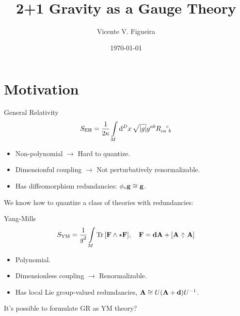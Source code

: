\documentclass{beamer}
\title{2+1 Gravity as a Gauge Theory}
\author{Vicente V. Figueira}
\institute{II Agorá Meeting --- IFUSP}
\date{\today}
\newcommand{\wedgecomma}{\stackon[1pt]{,}{\smash{\scriptsize$\wedge$}}}
\newcommand{\wedgecomm}[2]{\qty[ #1\ \wedgecomma\ #2 ]}
\begin{document}
\nocite{*}

\begin{frame}
    \vspace{2cm}
    \titlepage%
\end{frame}


\section{Motivation}
\begin{frame}{General Relativity}
    $$S_{\textnormal{EH}}=\frac{1}{2\kappa}\int\limits_M\dd[D]{x}\sqrt{\abs {g}}g^{ab}\tensor{R}{_c_a^c_b}$$\pause
    \begin{itemize}
        \item Non-polynomial $\rightarrow$ Hard to quantize.\pause
        \item Dimensionful coupling $\rightarrow$ Not perturbatively renormalizable.\pause
        \item Has diffeomorphism redundancies: $\phi_\ast\vb g\cong \vb g $.\pause
    \end{itemize}
    
    \vspace{2cm}

    We know how to quantize a class of theories with redundancies:
\end{frame}

\begin{frame}{Yang-Mills}
    $$S_{\textnormal{YM}}= \frac{1}{g^2}\int\limits_M\Tr\qty[\vb F\wedge \star \vb F],\ \ \ \vb F = \vb d\vb A+\wedgecomm{\vb A}{\vb A}$$
    \begin{itemize}
        \item Polynomial.\pause
        \item Dimensionless coupling $\rightarrow$ Renormalizable.\pause
        \item Has local Lie group-valued redundancies, $\vb A\cong U\qty(\vb A+\vb d)U^{-1}$.\pause
    \end{itemize}

    \vspace{1.5cm}

    It's possible to formulate GR as YM theory?

\end{frame}
\end{document}
